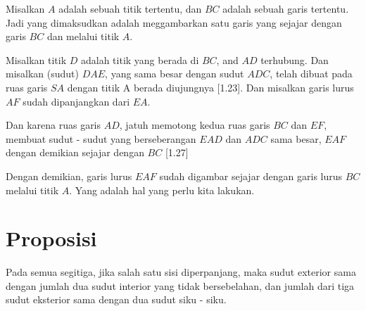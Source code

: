 \documentclass[a4paper]{book}
\begin{document}

Misalkan $A$ adalah sebuah titik tertentu, dan $BC$ adalah sebuah garis tertentu. Jadi
yang dimaksudkan adalah meggambarkan satu garis yang sejajar dengan garis $BC$ 
dan melalui titik $A$.

Misalkan titik $D$ adalah titik yang berada di $BC$, and $AD$ terhubung. 
Dan misalkan (sudut) $DAE$, yang sama besar dengan sudut $ADC$, telah dibuat 
pada ruas garis $SA$ dengan titik A berada diujungnya [1.23]. Dan misalkan garis
lurus $AF$ sudah dipanjangkan dari $EA$.

Dan karena ruas garis $AD$, jatuh memotong kedua ruas garis $BC$ dan $EF$, membuat 
sudut - sudut yang berseberangan $EAD$ dan $ADC$ sama besar, $EAF$ dengan demikian
sejajar dengan $BC$ [1.27]

Dengan demikian, garis lurus $EAF$ sudah digambar sejajar dengan garis lurus $BC$
melalui titik $A$. Yang adalah hal yang perlu kita lakukan.

\section*{\centering Proposisi \thesection} 

Pada semua segitiga, jika salah satu sisi diperpanjang, maka sudut exterior 
sama dengan jumlah dua sudut interior yang tidak bersebelahan, dan jumlah 
dari tiga sudut eksterior sama dengan dua sudut siku - siku.

\begin{center}
\end{center}
\end{document}

